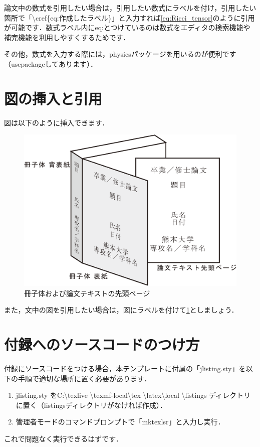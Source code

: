   論文中の数式を引用したい場合は，引用したい数式にラベルを付け，引用したい箇所で「\textbackslash cref\{eq:作成したラベル\}」と入力すれば\cref{eq:Ricci_tensor}のように引用が可能です．数式ラベル内にeq:とつけているのは数式をエディタの検索機能や補完機能を利用しやすくするためです．

  その他，数式を入力する際には，physicsパッケージを用いるのが便利です（usepackageしてあります）．

\section{図の挿入と引用}
図は以下のように挿入できます．
	\begin{figure}[htbp]
		\centering
		\includegraphics[width=1.0\linewidth,keepaspectratio]{./images/book.eps}
		\caption{冊子体および論文テキストの先頭ページ}
		\label{fig:overview}
	\end{figure}

また，文中の図を引用したい場合は，図にラベルを付けて\cref{fig:overview}としましょう．

\section{付録へのソースコードのつけ方}

付録にソースコードをつける場合，本テンプレートに付属の「jlisting.sty」を以下の手順で適切な場所に置く必要があります．

	\begin{enumerate}
		\item jlisting.sty をC:\textbackslash texlive \textbackslash texmf-local\textbackslash tex \textbackslash latex\textbackslash local \textbackslash listings ディレクトリに置く（listingsディレクトリがなければ作成）．
		\item 管理者モードのコマンドプロンプトで「mktexlsr」と入力し実行．
	\end{enumerate}

これで問題なく実行できるはずです．
